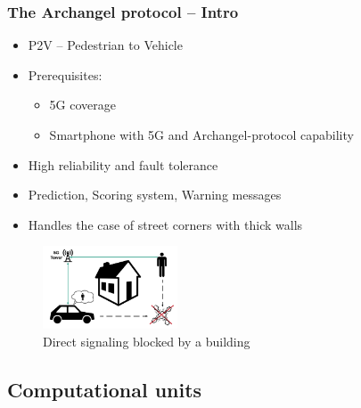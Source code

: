 \documentclass{beamer}
\begin{document}
\begin{frame}
    \frametitle{The Archangel protocol -- Intro}
    \begin{itemize}
        \item P2V -- Pedestrian to Vehicle
        \item Prerequisites:
            \begin{itemize}
                \item 5G coverage
                \item Smartphone with 5G and Archangel-protocol capability
            \end{itemize}
        \item High reliability and fault tolerance
        \item Prediction, Scoring system, Warning messages
        \item Handles the case of street corners with thick walls 
    \end{itemize}
    \begin{figure}[h]
        \centerline{\includegraphics[width=4cm]{./pics/Corner.png}}
        \caption{Direct signaling blocked by a building}
        \label{fig}
        \end{figure}
\end{frame}

\subsection{Computational units}
\end{document}
